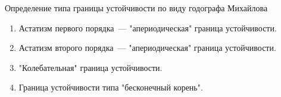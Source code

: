 Определение типа границы устойчивости по виду годографа Михайлова
\begin{enumerate}
    \item Астатизм первого порядка~--- "апериодическая" граница устойчивости.
    \item Астатизм второго порядка~--- "апериодическая" граница устойчивости.
    \item "Колебательная" граница устойчивости.
    \item Граница устойчивости типа "бесконечный корень".
\end{enumerate}
